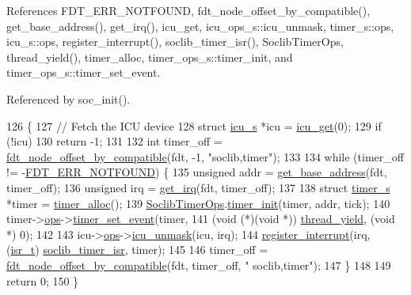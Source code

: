References F\-D\-T\-\_\-\-E\-R\-R\-\_\-\-N\-O\-T\-F\-O\-U\-N\-D, fdt\-\_\-node\-\_\-offset\-\_\-by\-\_\-compatible(), get\-\_\-base\-\_\-address(), get\-\_\-irq(), icu\-\_\-get, icu\-\_\-ops\-\_\-s\-::icu\-\_\-unmask, timer\-\_\-s\-::ops, icu\-\_\-s\-::ops, register\-\_\-interrupt(), soclib\-\_\-timer\-\_\-isr(), Soclib\-Timer\-Ops, thread\-\_\-yield(), timer\-\_\-alloc, timer\-\_\-ops\-\_\-s\-::timer\-\_\-init, and timer\-\_\-ops\-\_\-s\-::timer\-\_\-set\-\_\-event.



Referenced by soc\-\_\-init().


\begin{DoxyCode}
126 \{
127     \textcolor{comment}{// Fetch the ICU device}
128     \textcolor{keyword}{struct }\hyperlink{structicu__s}{icu\_s} *icu = \hyperlink{icu_8h_a8ea2773b171799420c4542ff4e3bac3c}{icu\_get}(0);
129     \textcolor{keywordflow}{if} (!icu)
130         \textcolor{keywordflow}{return} -1;
131 
132     \textcolor{keywordtype}{int} timer\_off = \hyperlink{fdt__ro_8c_a7fee20e876e2af4dd32e987c6c8f104a}{fdt\_node\_offset\_by\_compatible}(fdt, -1, \textcolor{stringliteral}{"soclib,timer"});
133 
134     \textcolor{keywordflow}{while} (timer\_off != -\hyperlink{libfdt_8h_a93cfa052f4b28df4bfc7d336b692fa07}{FDT\_ERR\_NOTFOUND}) \{
135         \textcolor{keywordtype}{unsigned} addr = \hyperlink{almo1-mips_2soc_8c_a8f32c2785fa3edd070abdaa34c96f6a7}{get\_base\_address}(fdt, timer\_off);
136         \textcolor{keywordtype}{unsigned} irq = \hyperlink{almo1-mips_2soc_8c_a7bd21ef4af7971db5dad06231290d8d1}{get\_irq}(fdt, timer\_off);
137 
138         \textcolor{keyword}{struct }\hyperlink{structtimer__s}{timer\_s} *timer = \hyperlink{timer_8h_a9b16e7c947532969c0eb7525c66405f6}{timer\_alloc}();
139         \hyperlink{soclib-timer_8c_aa3f96a0578c32ac8fd0d3b2526182084}{SoclibTimerOps}.\hyperlink{structtimer__ops__s_a0eb1142effbe0998fda5c43a6650dc93}{timer\_init}(timer, addr, tick);
140         timer->\hyperlink{structtimer__s_a859db5220e0605eabaa9100121940b5e}{ops}->\hyperlink{structtimer__ops__s_a68a024355e7c40dc7cf97b0e9975cf73}{timer\_set\_event}(timer,
141             (\textcolor{keywordtype}{void} (*)(\textcolor{keywordtype}{void} *)) \hyperlink{kthread_8c_affe2eebf6749bc36765d45ff48c926b1}{thread\_yield}, (\textcolor{keywordtype}{void} *) 0);
142 
143         icu->\hyperlink{structicu__s_a7f989a94a922fa1c782cfcf7547bd8c5}{ops}->\hyperlink{structicu__ops__s_a4aee28cc809733a67481e782c1efd1fa}{icu\_unmask}(icu, irq);
144         \hyperlink{kirq_8c_a7bb6fb99500c6f10708c7653cef722e8}{register\_interrupt}(irq, (\hyperlink{kirq_8h_a6c476c213249d7236d7888257e71628d}{isr\_t}) \hyperlink{soclib-timer_8c_ad4d0316e8dbbe5427118ba5a8a03f12d}{soclib\_timer\_isr}, timer);
145 
146         timer\_off = \hyperlink{fdt__ro_8c_a7fee20e876e2af4dd32e987c6c8f104a}{fdt\_node\_offset\_by\_compatible}(fdt, timer\_off, \textcolor{stringliteral}{"
      soclib,timer"});
147     \}
148 
149     \textcolor{keywordflow}{return} 0;
150 \}
\end{DoxyCode}
